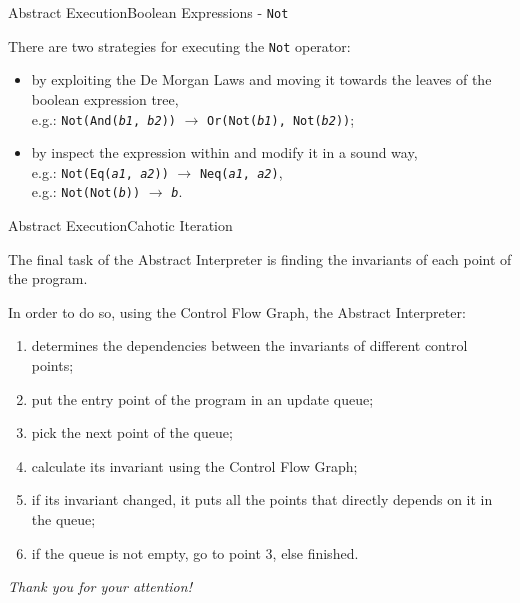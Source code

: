 \documentclass{beamer}
\begin{document}
\begin{frame}{Abstract Execution}{Boolean Expressions - \texttt{Not}}

    There are two strategies for executing the \texttt{Not} operator:
    \begin{itemize}
        \item by exploiting the De Morgan Laws and moving it towards the leaves of the boolean expression tree,\\
              e.g.: \texttt{Not(And(\textit{b1}, \textit{b2}))} $\rightarrow$ \texttt{Or(Not(\textit{b1}), Not(\textit{b2}))};
        \item by inspect the expression within and modify it in a sound way,\\
              e.g.: \texttt{Not(Eq(\textit{a1}, \textit{a2}))} $\rightarrow$ \texttt{Neq(\textit{a1}, \textit{a2})},\\
              e.g.: \texttt{Not(Not(\textit{b}))} $\rightarrow$ \texttt{\textit{b}}.
    \end{itemize}

\end{frame}

\begin{frame}{Abstract Execution}{Cahotic Iteration}

    The final task of the Abstract Interpreter is finding the invariants of each point of the program.

    In order to do so, using the Control Flow Graph, the Abstract Interpreter:
    \begin{enumerate}
        \item determines the dependencies between the invariants of different control points;
        \item put the entry point of the program in an update queue;
        \item pick the next point of the queue;
        \item calculate its invariant using the Control Flow Graph;
        \item if its invariant changed, it puts all the points that directly depends on it in the queue;
        \item if the queue is not empty, go to point 3, else finished.
    \end{enumerate}

\end{frame}

\begin{frame}
    \centering \huge
    \emph{Thank you for your attention!}
\end{frame}
\end{document}
